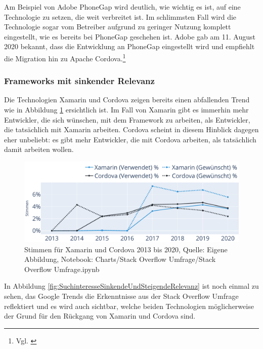 Am Beispiel von Adobe PhoneGap wird deutlich, wie wichtig es ist, auf eine Technologie zu setzen, die weit verbreitet ist. Im schlimmsten Fall wird die Technologie sogar vom Betreiber aufgrund zu geringer Nutzung komplett eingestellt, wie es bereits bei PhoneGap geschehen ist. Adobe gab am 11. August 2020 bekannt, dass die  Entwicklung an PhoneGap eingestellt wird und empfiehlt die Migration hin zu Apache Cordova.\footnote{Vgl. \cite{UpdateForCustomersUsingPhoneGapAndPhoneGapBuild}}

\subsubsection{Frameworks mit sinkender Relevanz}

Die Technologien Xamarin und Cordova zeigen bereits einen abfallenden Trend wie in Abbildung \ref{fig:XamarinUndCordovaStimmen} ersichtlich ist. Im Fall von Xamarin gibt es immerhin mehr Entwickler, die sich wünschen, mit dem Framework zu arbeiten, als Entwickler, die tatsächlich mit Xamarin arbeiten. Cordova scheint in diesem Hinblick dagegen eher unbeliebt: es gibt mehr Entwickler, die mit Cordova arbeiten, als tatsächlich damit arbeiten wollen.

\begin{figure}[H]
	\centering
    \includegraphics[width=1.0\textwidth]{Charts/Stack Overflow Umfrage/Xamarin und Cordova Stimmen.pdf}
	\caption[Stimmen für Xamarin und Cordova]{Stimmen für Xamarin und Cordova 2013 bis 2020, Quelle: Eigene Abbildung, Notebook: Charts/Stack Overflow Umfrage/Stack Overflow Umfrage.ipynb}
	\label{fig:XamarinUndCordovaStimmen}
\end{figure}

In Abbildung \ref{fig:SuchinteresseSinkendeUndSteigendeRelevanz} ist noch einmal zu sehen, das Google Trends die Erkenntnisse aus der Stack Overflow Umfrage reflektiert und es wird auch sichtbar, welche beiden Technologien möglicherweise der Grund für den Rückgang von Xamarin und Cordova sind.

